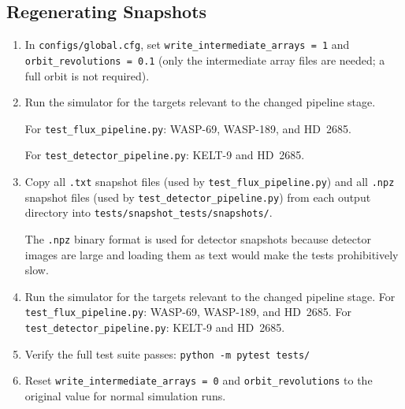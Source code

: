 \subsection{Regenerating Snapshots}
\begin{enumerate}
    \item In \texttt{configs/global.cfg}, set \texttt{write\_intermediate\_arrays = 1}
          and \texttt{orbit\_revolutions = 0.1} (only the intermediate array files
          are needed; a full orbit is not required).
    \item Run the simulator for the targets relevant to the changed pipeline stage.

          For \texttt{test\_flux\_pipeline.py}: WASP-69, WASP-189, and HD~2685.

          For \texttt{test\_detector\_pipeline.py}: KELT-9 and HD~2685.
    \item Copy all \texttt{.txt} snapshot files (used by \texttt{test\_flux\_pipeline.py})
          and all \texttt{.npz} snapshot files (used by \texttt{test\_detector\_pipeline.py})
          from each output directory into \texttt{tests/snapshot\_tests/snapshots/}.

          The \texttt{.npz} binary format is used for detector snapshots because
          detector images are large and loading them as text would make the tests
          prohibitively slow.
    \item Run the simulator for the targets relevant to the changed pipeline stage.
          For \texttt{test\_flux\_pipeline.py}: WASP-69, WASP-189, and HD~2685.
          For \texttt{test\_detector\_pipeline.py}: KELT-9 and HD~2685.
    \item Verify the full test suite passes: \texttt{python -m pytest tests/}
    \item Reset \texttt{write\_intermediate\_arrays = 0} and
          \texttt{orbit\_revolutions} to the original value for normal simulation runs.
\end{enumerate}
\newpage
